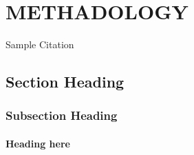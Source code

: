 \chapter{METHADOLOGY}


\hspace{2em} \blindtext %
 Sample Citation \cite{2,5}
 
\section{Section Heading}

\hspace{2em} \blindtext  %


\subsection{Subsection Heading}
\hspace{2em} \blindtext %

\subsubsection{Heading here}
\hspace{2em} \blindtext %

